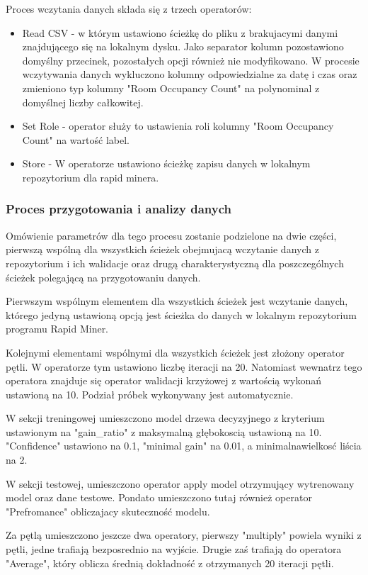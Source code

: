\documentclass[12pt,oneside,a4paper]{book} %
\theoremstyle{break}
\begin{document}
Proces wczytania danych składa się z trzech operatorów:

\begin{itemize}
  \item Read CSV - w którym ustawiono ścieżkę do pliku z brakujacymi danymi znajdującego się na lokalnym dysku. Jako separator kolumn pozostawiono domyślny przecinek, pozostałych opcji również nie modyfikowano. W procesie wczytywania danych wykluczono kolumny odpowiedzialne za datę i czas oraz zmieniono typ kolumny "Room Occupancy Count" na polynominal z domyślnej liczby całkowitej.
  \item Set Role - operator służy to ustawienia roli kolumny "Room Occupancy Count" na wartość label.
  \item Store - W operatorze ustawiono ścieżkę zapisu danych w lokalnym repozytorium dla rapid minera.
\end{itemize}

\subsubsection*{Proces przygotowania i analizy danych}

Omówienie parametrów dla tego procesu zostanie podzielone na dwie części, pierwszą wspólną dla wszystkich ścieżek obejmujacą wczytanie danych z repozytorium i ich walidacje oraz drugą charakterystyczną dla poszczególnych ścieżek polegającą na przygotowaniu danych.

Pierwszym wspólnym elementem dla wszystkich ścieżek jest wczytanie danych, którego jedyną ustawioną opcją jest ścieżka do danych w lokalnym repozytorium programu Rapid Miner.

Kolejnymi elementami wspólnymi dla wszystkich ścieżek jest złożony operator pętli. W operatorze tym ustawiono liczbę iteracji na 20. Natomiast wewnatrz tego operatora znajduje się operator walidacji krzyżowej z wartością wykonań ustawioną na 10. Podział próbek wykonywany jest automatycznie.

W sekcji treningowej umieszczono model drzewa decyzyjnego z kryterium ustawionym na "gain\_ratio" z maksymalną głębokoscią ustawioną na 10. "Confidence" ustawiono na 0.1, "minimal gain" na 0.01, a minimalnawielkosć liścia na 2.

W sekcji testowej, umieszczono operator apply model otrzymujący wytrenowany model oraz dane testowe. Pondato umieszczono tutaj również operator "Prefromance" obliczajacy skuteczność modelu.

Za pętlą umieszczono jeszcze dwa operatory, pierwszy "multiply" powiela wyniki z pętli, jedne trafiają bezposrednio na wyjście. Drugie zaś trafiają do operatora "Average", który oblicza średnią dokładność z otrzymanych 20 iteracji pętli.
\end{document}
